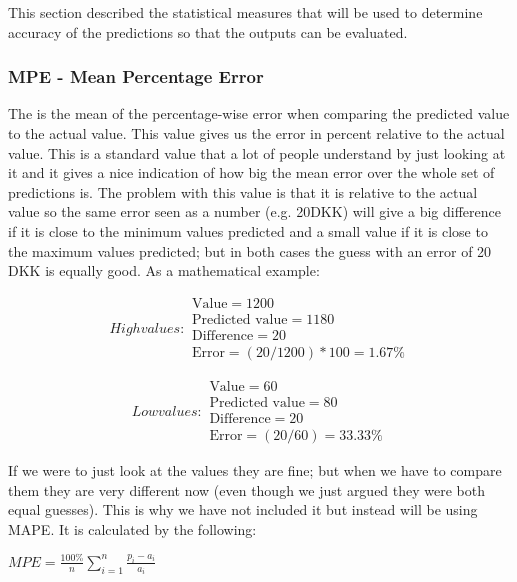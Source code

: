 This section described the statistical measures that will be used to determine accuracy of the predictions so that the outputs can be evaluated.

\subsubsection{MPE - Mean Percentage Error}
The  is the mean of the percentage-wise error when comparing the predicted value to the actual value. This value gives us the error in percent relative to the actual value. This is a standard value that a lot of people understand by just looking at it and it gives a nice indication of how big the mean error over the whole set of predictions is. The problem with this value is that it is relative to the actual value so the same error seen as a number (e.g. 20DKK) will give a big difference if it is close to the minimum values predicted and a small value if it is close to the maximum values predicted; but in both cases the guess with an error of 20 DKK is equally good. As a mathematical example:


\begin{subequations}
High values:
\begin{align}
 \text{Value} = 1200 \\
 \text{Predicted value} = 1180\\
 \text{Difference} = 20\\
 \text{Error} = (20/1200)*100 = 1.67\%
\end{align}
\end{subequations}

\begin{subequations}
Low values:
\begin{align}
 \text{Value} = 60 \\
 \text{Predicted value} = 80\\
 \text{Difference} = 20\\
 \text{Error} = (20/60) = 33.33\%
\end{align}
\end{subequations}


\noindent If we were to just look at the values they are fine; but when we have to compare them they are very different now (even though we just argued they were both equal guesses). This is why we have not included it but instead will be using MAPE.
It is calculated by the following:
\begin{center}
$ MPE = \frac{100\%}{n}\sum_{i=1}^{n}\frac{p_i - a_i}{a_i} $
\end{center}

